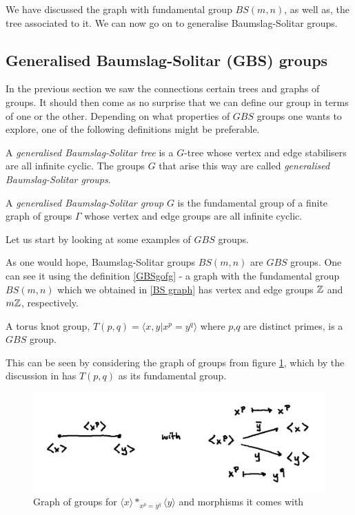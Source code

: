 We have discussed the graph with fundamental group $BS(m,n)$, as well as, the tree associated to it. We can now go on to generalise Baumslag-Solitar groups.

\subsection{Generalised Baumslag-Solitar (GBS) groups}

In the previous section we saw the connections certain trees and graphs of groups. It should then come as no surprise that we can define our group in terms of one or the other. Depending on what properties of $GBS$ groups one wants to explore, one of the following definitions might be preferable.

\begin{definition}\cite{For03}
    A \emph{generalised Baumslag-Solitar tree} is a $G$-tree whose vertex and edge stabilisers are all infinite cyclic. The groups $G$ that arise this way are called \emph{generalised Baumslag-Solitar groups}.
\end{definition}

\begin{definition}\cite{Le07}\label{GBSgofg}
    A \emph{generalised Baumslag-Solitar group} $G$ is the fundamental group of a finite graph of groups $\Gamma$ whose vertex and edge groups are all infinite cyclic.
\end{definition}

Let us start by looking at some examples of $GBS$ groups.

\begin{example}
    As one would hope, Baumslag-Solitar groups $BS(m,n)$ are $GBS$ groups. One can see it using the definition \ref{GBSgofg} -  a graph with the fundamental group $BS(m,n)$ which we obtained in \ref{BS graph} has vertex and edge groups $\mathbb{Z}$ and $m\mathbb{Z}$, respectively.
\end{example}

\begin{example} 
    A torus knot group, $T(p,q) = \langle x,y | x^p = y^q \rangle$ where $p$,$q$ are distinct primes, is a $GBS$ group.

    This can be seen by considering the graph of groups from figure \ref{T(p,q) graph}, which by the discussion in \cite{Jo23} has $T(p,q)$ as its fundamental group.
\end{example}

\begin{figure}[h]
    \centering
    \includegraphics[width=0.5\linewidth]{sections/alicja/Graph for T(p,q).jpeg}
    \caption{Graph of groups for $\langle x \rangle \ast_{x^p = y^q} \langle y \rangle$ and morphisms it comes with} 
    \label{T(p,q) graph}
\end{figure}

